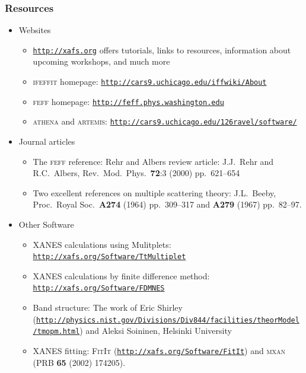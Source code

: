 \documentclass[10pt, xcolor=x11names, compress]{beamer}
\begin{document}
\begin{frame}
  \frametitle{Resources}
  \begin{itemize}
  \item Websites
    \begin{itemize}
    \item \footnotesize
      \href{http://xafs.org}{\color{Purple4}\texttt{http://xafs.org}}
      offers tutorials, links to resources, information about upcoming
      workshops, and much more
    \item \textsc{ifeffit} homepage:
      \href{http://cars9.uchicago.edu/iffwiki/About}
      {\color{Purple4}\texttt{http://cars9.uchicago.edu/iffwiki/About}}
    \item \textsc{feff} homepage:
      \href{http://feff.phys.washington.edu}
      {\color{Purple4}\texttt{http://feff.phys.washington.edu}}
    \item \textsc{athena} and \textsc{artemis}:
      \href{http://cars9.uchicago.edu/~ravel/software/}
      {\color{Purple4}\texttt{http://cars9.uchicago.edu/\char126ravel/software/}}
    \end{itemize}
  \item Journal articles
    \begin{itemize}
    \item \footnotesize The \textsc{feff} reference: Rehr and Albers review article:   J.J.~Rehr and R.C.~Albers,
      Rev.\ Mod.\ Phys.\ \textbf{72}:3 (2000) pp.\ 621--654
    \item Two excellent references on multiple scattering theory:
      J.L.~Beeby, Proc.\ Royal Soc.\ \textbf{A274} (1964) pp.\
      309--317 and \textbf{A279} (1967) pp.\ 82--97.
    \end{itemize}
  \item Other Software
    \begin{itemize}
    \item \footnotesize XANES calculations using Mulitplets:
      \href{http://xafs.org/Software/TtMultiplet}
      {\color{Purple4}\texttt{http://xafs.org/Software/TtMultiplet}}
    \item XANES calculations by finite difference method:
      \href{http://xafs.org/Software/FDMNES}
      {\color{Purple4}\texttt{http://xafs.org/Software/FDMNES}}
    \item Band structure: The work of Eric Shirley
      (\href{http://physics.nist.gov/Divisions/Div844/facilities/theorModel/tmopm.html}
      {\color{Purple4}\tiny \texttt{http://physics.nist.gov/Divisions/Div844/facilities/theorModel/tmopm.html}}) and
      Aleksi Soininen, Helsinki University
    \item XANES fitting: \textsc{FitIt} (\href{http://xafs.org/Software/FitIt}{\color{Purple4}\texttt{http://xafs.org/Software/FitIt}})
      and \textsc{mxan} (PRB \textbf{65} (2002) 174205).
    \end{itemize}
  \end{itemize}
\end{frame}
\end{document}
